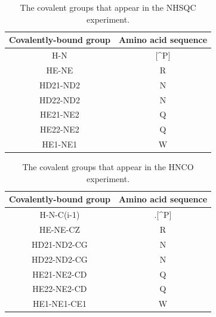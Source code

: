 \begin{table}
  \begin{tabular}{ | c | c | }
    \hline
    Covalently-bound group  &  Amino acid sequence  \\  \hline
    H-N                          &  [\^{}P]              \\  \hline
    HE-NE                        &  R                    \\  \hline
    HD21-ND2                     &  N                    \\  \hline
    HD22-ND2                     &  N                    \\  \hline
    HE21-NE2                     &  Q                    \\  \hline
    HE22-NE2                     &  Q                    \\  \hline
    HE1-NE1                      &  W                    \\  \hline
  \end{tabular}
  \caption{The covalent groups that appear in the NHSQC experiment.}
  \label{nhsqc_peaktypes}
\end{table}

\begin{table}
  \begin{tabular}{ | c | c | }
    \hline
    Covalently-bound group  &  Amino acid sequence  \\  \hline
    H-N-C(i-1)                   &  .[\^{}P]             \\  \hline
    HE-NE-CZ                     &  R                    \\  \hline
    HD21-ND2-CG                  &  N                    \\  \hline
    HD22-ND2-CG                  &  N                    \\  \hline
    HE21-NE2-CD                  &  Q                    \\  \hline
    HE22-NE2-CD                  &  Q                    \\  \hline
    HE1-NE1-CE1                  &  W                    \\  \hline
  \end{tabular}
  \caption{The covalent groups that appear in the HNCO experiment.}
  \label{hnco_peaktypes}
\end{table}
    
